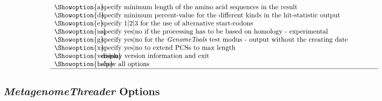 \documentclass[12pt,titlepage]{article}
\newcommand{\MetagenomeThreader}{\textit{MetagenomeThreader}\xspace}
\newcommand{\GenomeTools}{\textit{GenomeTools}\xspace}
\begin{document}
\begin{table}[htbp]
\begin{footnotesize}
\[\begin{tabular}{p{2cm}p{14cm}}
\\
\Showoption{a}& specify minimum length of the amino acid sequences in the result
\\
\Showoption{d}& specify minimum percent-value for the different kinds in the hit-statistic output
\\
\Showoption{e}& specify 1$|$2$|$3 for the use of alternative start-codons
\\
\Showoption{m}& specify yes$|$no if the processing has to be based on homology - experimental
\\
\Showoption{g}& specify yes$|$no for the \GenomeTools test modus - output without the creating date
\\
\Showoption{x}& specify yes$|$no to extend PCSs to max length
\\
\Showoption{version}& display version information and exit
\\
\Showoption{help}& show all options
\\
\hline
\end{tabular}
%
\]
\end{footnotesize}
\label{overviewOpt}
\end{table}

\subsection{\MetagenomeThreader Options}
\end{document}
